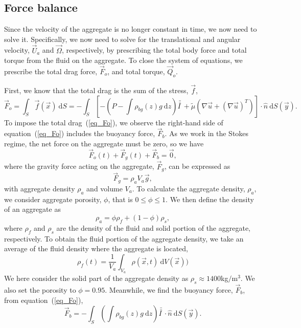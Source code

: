 \subsection{Force balance}
\label{sec:force_balance}
\par
Since the velocity of the aggregate is no longer constant in time, we now need to solve it.
Specifically, we now need to solve for the translational and angular velocity, $\vec{U}_a$ and $\vec{\Omega}$, respectively, by prescribing the total body force and total torque from the fluid on the aggregate.
To close the system of equations, we prescribe the total drag force, $\vec{F}_o$, and total torque, $\vec{Q}_o$. 

First, we know that the total drag is the sum of the stress, $\vec{f}$,
\begin{equation}
	 \vec{F}_o = \int_S \vec{f} (\vec{x}) \ \textrm{d}S 
	= - \int_S \left[ 
	 - \left( P -  \int \rho_{bg}(z) g \ \textrm{d}z \right) \bar{\bar{I \ }} 
	 + \tilde{\mu} \left( \nabla \vec{u} + (\nabla \vec{u})^{T} \right)
	 \right] \cdot \hat{n} \ \textrm{d}S (\vec{y}).
\label{eq_Fo}
\end{equation}
To impose the total drag~(\ref{eq_Fo}), we observe the right-hand side of equation~(\ref{eq_Fo}) includes the buoyancy force, $\vec{F}_{b}$. 
As we work in the Stokes regime, the net force on the aggregate must be zero, so we have
\begin{equation}
	\vec{F}_o (t)+\vec{F}_g(t) + \vec{F}_b = \vec{0},
	\label{eq_Full_Force}
\end{equation} 
where the gravity force acting on the aggregate, $\vec{F}_g$, can be expressed as
\begin{equation}
	\vec{F}_g = \rho_a V_a \vec{g}, 
	\label{eq_F_gravity}
\end{equation}
with aggregate density $\rho_a$ and volume $V_a$. 
To calculate the aggregate density, $\rho_a$, we consider aggregate porosity, $\phi$, that is $ 0 \leq \phi \leq 1$.
 We then define the density of an aggregate as 
\begin{equation}
	\rho_a  = \phi \rho_{f} + (1-\phi) \rho_{s},
	\label{eq_rho_a}
\end{equation}
where $\rho_{f}$ and $\rho_s$ are the density of the fluid and solid portion of the aggregate, respectively. To obtain the fluid portion of the aggregate density, we take an average of the fluid density where the aggregate is located,
\begin{equation}
	\rho_{f}(t) = \frac{1}{V_a}\int_{V_a} \rho(\vec{x}, t) \  \textrm{d}V(\vec{x}))
\end{equation}
We here consider the solid part of the aggregate density as $\rho_s \approx 1400 $kg$/$m$^3.$ 
We also set the porosity to $\phi = 0.95$.
Meanwhile, we find the buoyancy force, $\vec{F}_b$, from equation~(\ref{eq_Fo}),
\begin{equation}
 \vec{F}_b =	  -  \int_S \left( 
	   \int \rho_{bg}(z) g \ \textrm{d}z 
	 \right) \bar{\bar{I \ }}  \cdot
	\hat{n} \ \textrm{d}S (\vec{y}).
\label{eq_F_buoyancy}
\end{equation}

